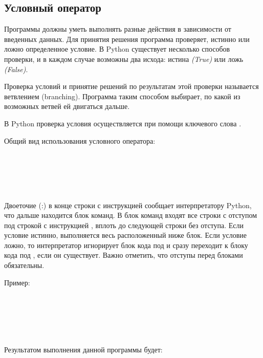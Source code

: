 \subsection{Условный оператор}

Программы должны уметь выполнять разные действия в зависимости от введенных данных. Для принятия решения программа проверяет, истинно или ложно определенное условие. В Python существует несколько способов проверки, и в каждом случае возможны два исхода: истина \textit{(True)} или ложь \textit{(False)}. 

Проверка условий и принятие решений по результатам этой проверки называется ветвлением (branching). Программа таким способом выбирает, по какой из возможных ветвей ей двигаться дальше.

В Python проверка условия осуществляется при помощи ключевого слова .

Общий вид использования условного оператора:

\begin{flushleft}
	 \\
	 \\
	 \\
	 \\
\end{flushleft}

Двоеточие (:) в конце строки с инструкцией  сообщает интерпретатору Python, что дальше находится блок команд. В блок команд входят все строки с отступом под строкой с инструкцией , вплоть до следующей строки без отступа. Если условие истинно, выполняется весь расположенный ниже блок. Если условие ложно, то интерпретатор игнорирует блок кода под  и сразу переходит к блоку кода под , если он существует. Важно отметить, что отступы перед блоками обязательны.

Пример:

\begin{flushleft}
	 \\
	 \\
	 \\
	 \\
	 \\
	Результатом выполнения данной программы будет: \\
	 \\
\end{flushleft}

